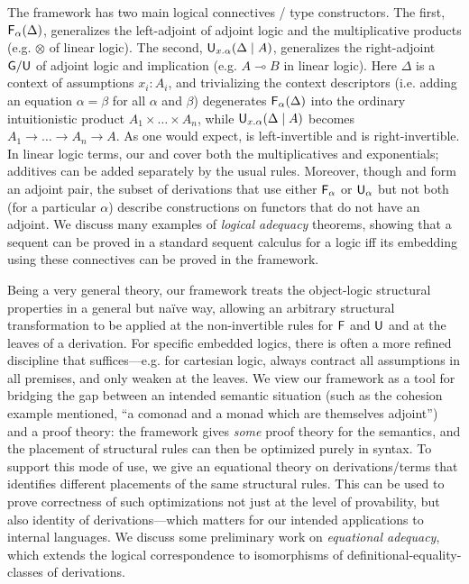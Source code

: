 \documentclass[a4paper,USenglish,numberwithinsect]{lipics-v2016}
\newcommand\F[2]{\ensuremath{\dsd{F}_{#1}(#2)}}
\newcommand\U[3]{\ensuremath{\dsd{U}_{#1}(#2 \mid #3)}}
\newcommand\lolli\multimap
\begin{document}
The framework has two main logical connectives / type constructors.  The
first, \F{\alpha}{\Delta}, generalizes the left-adjoint  of
adjoint logic and the multiplicative products (e.g. $\otimes$ of linear
logic).  The second, \U{x.\alpha}{\Delta}{A}, generalizes the
right-adjoint $\mathsf{G}/\mathsf{U}$ of adjoint logic and implication
(e.g. $A \lolli B$ in linear logic).  Here $\Delta$ is a context of
assumptions $x_i:A_i$, and trivializing the context descriptors
(i.e. adding an equation $\alpha = \beta$ for all $\alpha$ and $\beta$)
degenerates $\F{\alpha}{\Delta}$ into the ordinary intuitionistic
product $A_1 \times \ldots \times A_n$, while \U{x.\alpha}{\Delta}{A}
becomes $A_1 \to \ldots \to A_n \to A$.  As one would expect,  is
left-invertible and  is right-invertible.  In linear logic terms,
our  and  cover both the multiplicatives and exponentials;
additives can be added separately by the usual rules.  Moreover, though
 and  form an adjoint pair, the subset of derivations that
use either $\mathsf{F}_\alpha$ or $\mathsf{U}_\alpha$ but not both (for a
particular $\alpha$) describe constructions on functors that do not have
an adjoint.  We discuss many examples of \emph{logical adequacy}
theorems, showing that a sequent can be proved in a standard sequent
calculus for a logic iff its embedding using these connectives can be
proved in the framework.

Being a very general theory, our framework treats the object-logic
structural properties in a general but na\"ive way, allowing an
arbitrary structural transformation to be applied at the non-invertible
rules for $\mathsf{F}$ and $\mathsf{U}$ and at the leaves of a derivation.
For specific embedded logics, there is often a more refined discipline
that suffices---e.g. for cartesian logic, always contract all
assumptions in all premises, and only weaken at the leaves.  We view our
framework as a tool for bridging the gap between an intended semantic
situation (such as the cohesion example mentioned, ``a comonad and a
monad which are themselves adjoint'') and a proof theory: the framework
gives \emph{some} proof theory for the semantics, and the placement of
structural rules can then be optimized purely in syntax.  To support
this mode of use, we give an equational theory on derivations/terms
that identifies different placements of the same structural rules.  This
can be used to prove correctness of such optimizations not just at the
level of provability, but also identity of derivations---which matters
for our intended applications to internal languages.  We discuss some
preliminary work on \emph{equational adequacy}, which extends the
logical correspondence to isomorphisms of definitional-equality-classes
of derivations.
\end{document}

